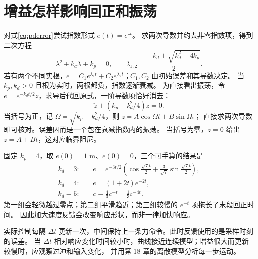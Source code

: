 \section{增益怎样影响回正和振荡}
对式\eqref{eq:pderror}尝试指数形式 $e(t)=e^{\lambda t}$。
求两次导数并约去非零指数项，得到二次方程
\[
 \lambda^2+k_d\lambda+k_p=0,\qquad
 \lambda_{1,2}=\frac{-k_d\pm\sqrt{k_d^2-4k_p}}{2}.
\]
若有两个不同实根，$e=C_1e^{\lambda_1t}+C_2e^{\lambda_2t}$；$C_1,C_2$ 由初始误差和其导数决定。
当 $k_p,k_d>0$ 且根为实时，两根都负，指数逐渐衰减。
为直接看出振荡，令 $e=e^{-k_dt/2}z$，求导后代回原式，一阶导数项恰好消去：
\[
 \ddot z+(k_p-k_d^2/4)z=0.
\]
当括号为正，记 $\Omega=\sqrt{k_p-k_d^2/4}$，则 $z=A\cos\Omega t+B\sin\Omega t$；
直接求两次导数即可核对。误差因而是一个包在衰减指数内的振荡。
当括号为零，$\ddot z=0$ 给出 $z=A+Bt$，这对应临界阻尼。

固定 $k_p=4$，取 $e(0)=1$ m、$\dot e(0)=0$，三个可手算的结果是
\begin{align*}
 k_d=3:&\quad e=e^{-3t/2}\left(\cos\frac{\sqrt7t}{2}+\frac3{\sqrt7}\sin\frac{\sqrt7t}{2}\right),\\
 k_d=4:&\quad e=(1+2t)e^{-2t},\\
 k_d=5:&\quad e=\tfrac43e^{-t}-\tfrac13e^{-4t}.
\end{align*}
第一组会轻微越过零点；第二组平滑趋近；第三组较慢的 $e^{-t}$ 项拖长了末段回正时间。
因此加大速度反馈会改变响应形状，而非一律加快响应。

\begin{center}\begin{minipage}{\linewidth}\makeatletter{}\makeatother
\centering
{}
\caption{相同位置增益下的误差响应。图由上面的解析式生成；初始误差是 1 m，参考本身可以随时间运动。}
\end{minipage}\end{center}
实际控制每隔 $\Delta t$ 更新一次，中间保持上一条力命令。此时反馈使用的是采样时刻的误差。
当 $\Delta t$ 相对响应变化时间较小时，曲线接近连续模型；增益很大而更新较慢时，应观察过冲和输入变化，
并用第 18 章的离散模型分析每一步运动。

